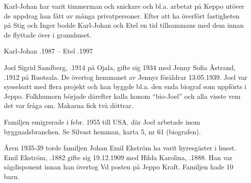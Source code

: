 Karl-Johan har varit timmerman och snickare och bl.a. arbetat på Keppo utöver de uppdrag han fått av många privatpersoner. Efter att ha överfört fastigheten på Stig och Inger bodde Karl-Johan och Etel en tid tillsammans med dem innan de flyttade över i grannhuset.
\begin{jhchildren}
  \item {}
  \item {}
  \item {}
  \item {}
  \item {}
\end{jhchildren}
Karl-Johan .1987  --  Etel .1997


Joel Sigrid Sandberg, .1914 på Ojala, gifte sig 1934 med Jenny Sofia Åstrand, .1912 på Ruotsala. De övertog hemmanet av Jennys föräldrar 13.05.1939. Joel var sysselsatt med  flera projekt och han  byggde bl.a. den enda biograf som uppförts i Jeppo. Folkhumorn började därefter kalla honom ``bio-Joel'' och alla visste vem det var fråga om. Makarna fick två döttrar.
\begin{jhchildren}
  \item {}
  \item {}
\end{jhchildren}
Familjen emigrerade i febr. 1955 till USA. där Joel arbetade inom byggnadsbranchen. Se Silvast hemman, karta 5, nr 61    (biografen).


Åren 1935-39 torde familjen Johan Emil Ekström ha varit hyresgäster i huset. Emil Ekström, .1882 gifte sig 19.12.1909 med Hilda Karolina, .1888. Han var sågdisponent innan han övertog Vd posten på Jeppo Kraft. Familjen hade 10 barn.
\begin{jhchildren}
  \item {}
  \item {}
  \item {}
  \item {}
  \item {}
  \item {}
  \item {}
  \item {}
  \item {}
  \item {}
\end{jhchildren}


